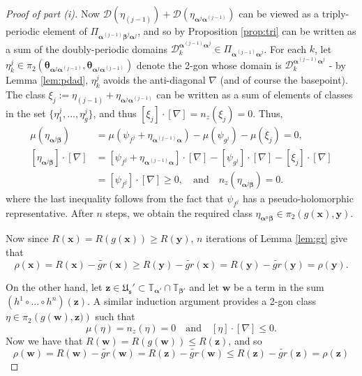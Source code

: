\documentclass[11pt]{article}
\theoremstyle{plain} \newtheorem{thm}{Theorem}[subsection]
\theoremstyle{plain} \newtheorem{cor}[thm]{Corollary}
\theoremstyle{plain} \newtheorem{prop}[thm]{Proposition}
\theoremstyle{plain} \newtheorem{conj}[thm]{Conjecture}
\theoremstyle{plain} \newtheorem{lem}[thm]{Lemma}
\theoremstyle{definition} \newtheorem{df}[thm]{Definition}
\theoremstyle{remark} \newtheorem{rmk}[thm]{Remark}
\theoremstyle{remark} \newtheorem{obs}[thm]{Observation}
\newcommand{\DD}{\mathcal{D}}
\newcommand{\tld}[1]{\widetilde{#1}}
\newcommand{\Us}{\mathfrak{U}_{\mathfrak{s}}}
\newcommand{\ba}{\boldsymbol{\alpha}}
\newcommand{\bb}{\boldsymbol{\beta}}
\newcommand{\bx}{\mathbf{x}}
\newcommand{\by}{\mathbf{y}}
\newcommand{\bw}{\mathbf{w}}
\newcommand{\bz}{\mathbf{z}}
\newcommand{\thet}[1]{\boldsymbol{\theta}_{#1}}
\newcommand{\tor}[1]{\mathbb{T}_{#1}}
\newcommand{\AD}{\nabla}
\begin{document}
\begin{proof}[Proof of part (i)]
Now $\DD(\eta_{(j-1)}) + \DD(\eta_{\ba^{j}\ba^{(j-1)}})$ can be viewed as a triply-periodic element of  $\Pi_{\ba^{(j-1)}\bb^j\ba^{j}}$, and so by Proposition \ref{prop:tri} can be written as a sum of the doubly-periodic domains $\DD^{\ba^{(j-1)}\ba^{j}}_{k} \in \Pi_{\ba^{(j-1)}\ba^{j}}$.  For each $k$, let $\eta_{k}^{j} \in \pi_{2}(\thet{\ba^{j}\ba^{(j-1)}}, \thet{\ba^{j}\ba^{(j-1)}})$ denote the 2-gon whose domain is $\DD^{\ba^{(j-1)}\ba^{j}}_{k}$ - by Lemma \ref{lem:pdad}, $\eta_{k}^j$ avoids the anti-diagonal $\AD$ (and of course the basepoint).  The class $\xi_j := \eta_{(j-1)} + \eta_{\ba^{j}\ba^{(j-1)}}$ can be written as a sum of elements of classes in the set $\{  \eta_{1}^{j}, \ldots, \eta_{g}^{j} \}$, and thus $[\xi_j]\cdot [\AD] = n_{z}(\xi_j)= 0$.  Thus,
\begin{align*}
\mu(\eta_{\ba^{j}\bb}) &=\mu(\psi_{f^{j}} + \eta_{\ba^{(j-1)}\ba}) - \mu(\psi_{g^{j}}) - \mu(\xi_j) =0,\\
[\eta_{\ba^{j}\bb}]\cdot [\AD] &= [\psi_{f^{j}} + \eta_{\ba^{(j-1)}\ba}]\cdot [\AD] - [\psi_{g^{j}}]\cdot [\AD] - [\xi_j]\cdot [\AD]\\
&= [\psi_{f^{j}}]\cdot [\AD] \geq 0, \quad \text{and} \quad n_z(\eta_{\ba^{j}\bb}) = 0.
\end{align*}
where the last inequality follows from the fact that $\psi_{f^{j}}$ has a pseudo-holomorphic representative.  After $n$ steps, we obtain the required class $\eta_{\ba^n\bb} \in \pi_2 (g(\bx), \by)$.

Now since $R(\bx) = R(g(\bx)) \geq R(\by)$, $n$ iterations of Lemma \ref{lem:gr} give that
\begin{equation*}
\rho(\bx) = R(\bx) - \tld{gr}(\bx) \geq R(\by) - \tld{gr}(\bx) = R(\by) - \tld{gr}(\by) = \rho(\by).
\end{equation*}

On the other hand, let $\bz \in \Us' \subset \tor{\ba'} \cap \tor{\bb'}$ and let $\bw$ be a term in the sum $(h^1 \circ \ldots \circ h^{n})(\bz)$.  A similar induction argument provides a 2-gon class $\eta \in \pi_2 \left( g(\bw), \bz) \right)$ such that
$$ \mu(\eta) = n_z(\eta) = 0 \quad \text{and} \quad [\eta] \cdot [\AD] \leq 0.$$
Now we have that $R(\bw) = R(g(\bw)) \leq R(\bz)$, and so
$$ \rho(\bw) = R(\bw) - \tld{gr}(\bw) = R(\bz) - \tld{gr}(\bw) \leq R(\bz) - \tld{gr}(\bz) =\rho(\bz)$$
\end{proof}
\end{document}
